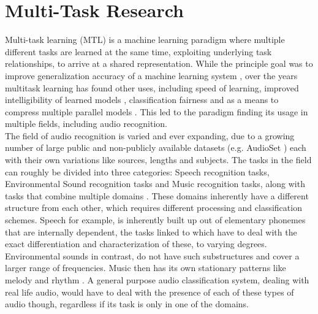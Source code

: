 \section{Multi-Task Research}

Multi-task learning (MTL) is a machine learning paradigm where multiple different tasks are learned at the same time, exploiting underlying task relationships, to arrive at a shared representation. While the principle goal was to improve generalization accuracy of a machine learning system \citep{caruana1997multitask}, over the years multitask learning has found other uses, including speed of learning, improved intelligibility of learned models \citep{caruana1997multitask}, classification fairness \citep{oneto2019taking} and as a means to compress multiple parallel models \citep{georgiev2017heterogeneous}. This led to the paradigm finding its usage in multiple fields, including audio recognition.\\

The field of audio recognition is varied and ever expanding, due to a growing number of large public and non-publicly available datasets (e.g. AudioSet \citep{gemmeke2017audio}) each with their own variations like sources, lengths and subjects. The tasks in the field can roughly be divided into three categories: Speech recognition tasks, Environmental Sound recognition tasks and Music recognition tasks, along with tasks that combine multiple domains \citep{duan2014survey}. These domains inherently have a different structure from each other, which requires different processing and classification schemes. Speech for example, is inherently built up out of elementary phonemes that are internally dependent, the tasks linked to which have to deal with the exact differentiation and characterization of these, to varying degrees. Environmental sounds in contrast, do not have such substructures and cover a larger range of frequencies. Music then has its own stationary patterns like melody and rhythm \citep{boregowda2018environmental}. A general purpose audio classification system, dealing with real life audio, would have to deal with the presence of each of these types of audio though, regardless if its task is only in one of the domains.\\    

